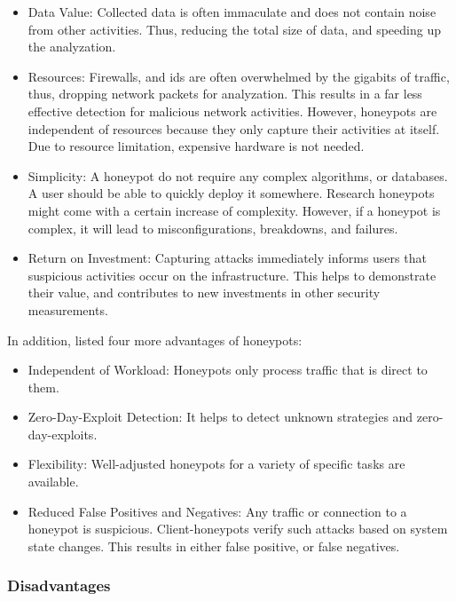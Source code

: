 \begin{itemize}
    \item Data Value: Collected data is often immaculate and does not contain noise from other activities.
          Thus, reducing the total size of data, and speeding up the analyzation.
    \item Resources: Firewalls, and \ac{ids} are often overwhelmed by the gigabits of traffic, thus, dropping network packets for analyzation.
          This results in a far less effective detection for malicious network activities.
          However, honeypots are independent of resources because they only capture their activities at itself.
          Due to resource limitation, expensive hardware is not needed.
    \item Simplicity: A honeypot do not require any complex algorithms, or databases.
          A user should be able to quickly deploy it somewhere.
          Research honeypots might come with a certain increase of complexity. 
          However, if a honeypot is complex, it will lead to misconfigurations, breakdowns, and failures.
    \item Return on Investment: Capturing attacks immediately informs users that suspicious activities occur on the infrastructure.
          This helps to demonstrate their value, and contributes to new investments in other security measurements.
\end{itemize}

In addition, \citet{NawrockiWSKS2016} listed four more advantages of honeypots:

\begin{itemize}
    \item Independent of Workload: Honeypots only process traffic that is direct to them.
    \item Zero-Day-Exploit Detection: It helps to detect unknown strategies and zero-day-exploits.
    \item Flexibility: Well-adjusted honeypots for a variety of specific tasks are available.
    \item Reduced False Positives and Negatives: Any traffic or connection to a honeypot is suspicious.
          Client-honeypots verify such attacks based on system state changes.
          This results in either false positive, or false negatives.
\end{itemize}

\subsubsection{Disadvantages}


